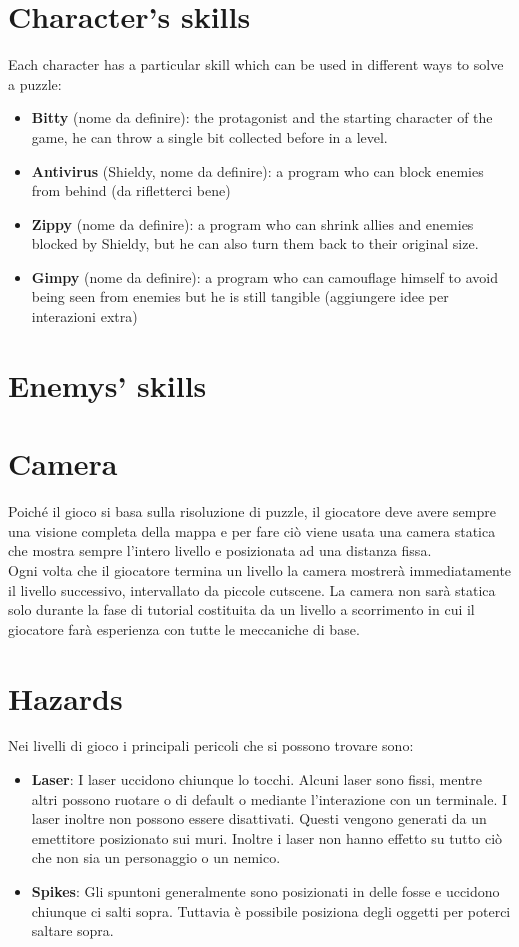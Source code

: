 \documentclass[12pt, a4paper]{report}
\begin{document}
\section*{Character’s skills}
Each character has a particular skill which can be used in different ways to solve a puzzle:
\begin{itemize}
\item \textbf{Bitty} (nome da definire): the protagonist and the starting character of the game, he can throw a single bit collected before in a level.
\item \textbf{Antivirus} (Shieldy, nome da definire): a program who can block enemies from behind (da rifletterci bene)
\item \textbf{Zippy} (nome da definire): a program who can shrink allies and enemies blocked by Shieldy, but he can also turn them back to their original size.
\item \textbf{Gimpy} (nome da definire): a program who can camouflage himself to avoid being seen from enemies but he is still tangible (aggiungere idee per interazioni extra)	
\end{itemize}

\section*{Enemys' skills}
\section*{Camera}
Poiché il gioco si basa sulla risoluzione di puzzle, il giocatore deve avere sempre una visione completa della mappa e per fare ciò viene usata una camera statica che mostra sempre l'intero livello e posizionata ad una distanza fissa.\\
Ogni volta che il giocatore termina un livello la camera mostrerà immediatamente il livello successivo, intervallato da piccole cutscene. La camera non sarà statica solo durante la fase di tutorial costituita da un livello a scorrimento in cui il giocatore farà esperienza con tutte le meccaniche di base.

\section*{Hazards}
Nei livelli di gioco i principali pericoli che si possono trovare sono:
\begin{itemize}
	\item \textbf{Laser}: I laser uccidono chiunque lo tocchi. Alcuni laser sono fissi, mentre altri possono ruotare o di default o mediante l'interazione con un terminale. I laser inoltre non possono essere disattivati. Questi vengono generati da un emettitore posizionato sui muri. Inoltre i laser non hanno effetto su tutto ciò che non sia un personaggio o un nemico.
	\item \textbf{Spikes}: Gli spuntoni generalmente sono posizionati in delle fosse e uccidono chiunque ci salti sopra. Tuttavia è possibile posiziona degli oggetti per poterci saltare sopra.
\end{itemize}
\end{document}
